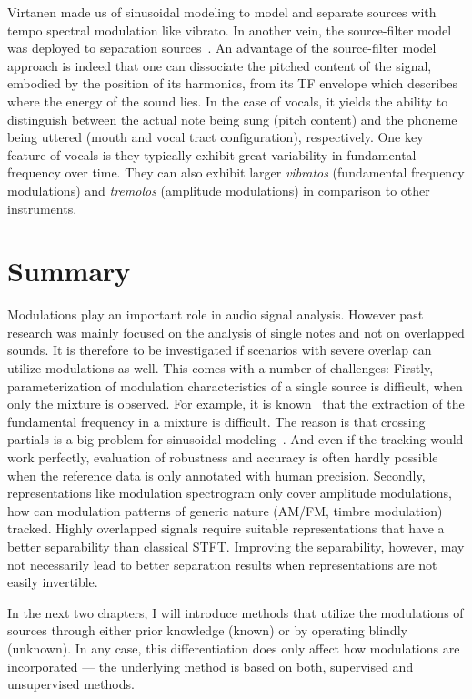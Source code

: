 Virtanen made us of sinusoidal modeling \cite{virtanen00} to model and separate sources with tempo spectral modulation like vibrato.
In another vein, the source-filter model was deployed to separation sources~\cite{hennequin10}.
An advantage of the source-filter model approach is indeed that one can dissociate the pitched content of the signal, embodied by the position of its harmonics, from its TF envelope which describes where the energy of the sound lies. In the case of vocals, it yields the ability to distinguish between the actual note being sung (pitch content) and the phoneme being uttered (mouth and vocal tract configuration), respectively. 
One key feature of vocals is they typically exhibit great variability in fundamental frequency over time. They can also exhibit larger \textit{vibratos} (fundamental frequency modulations) and \textit{tremolos} (amplitude modulations) in comparison to other instruments.


\section{Summary}

Modulations play an important role in audio signal analysis. 
However past research was mainly focused on the analysis of single notes and not on overlapped sounds.
It is therefore to be investigated if scenarios with severe overlap can utilize modulations as well.
This comes with a number of challenges: Firstly, parameterization of modulation characteristics of a single source is difficult, when only the mixture is observed. 
For example, it is known~\cite{salamon13} that the extraction of the fundamental frequency in a mixture is difficult. 
The reason is that crossing partials is a big problem for sinusoidal modeling~\cite{viste03}. 
And even if the tracking would work perfectly, evaluation of robustness and accuracy is often hardly possible when the reference data is only annotated with human precision.
Secondly, representations like modulation spectrogram only cover amplitude modulations, how can modulation patterns of generic nature (AM/FM, timbre modulation) tracked.
Highly overlapped signals require suitable representations that have a better separability than classical STFT.
Improving the separability, however, may not necessarily lead to better separation results when representations are not easily invertible.
\par
In the next two chapters, I will introduce methods that utilize the modulations of sources through either prior knowledge (known) or by operating blindly (unknown).
In any case, this differentiation does only affect how modulations are incorporated --- the underlying method is based on both, supervised and unsupervised methods.
